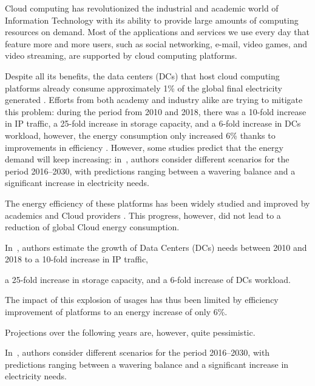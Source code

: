 
Cloud computing has revolutionized the industrial and academic world of Information Technology with its ability to provide large amounts of computing resources on demand. Most of the applications and services we use every day that feature more and more users, such as social networking, e-mail, video games, and video streaming, are supported by cloud computing platforms.

Despite all its benefits, the data centers (DCs) that host cloud computing platforms already consume approximately 1\% of the global final electricity generated \cite{IEA_2022}. Efforts from both academy and industry alike are trying to mitigate this problem: during the period from 2010 and 2018, there was a 10-fold increase in IP traffic, a 25-fold increase in storage capacity, and a 6-fold increase in DCs workload, however, the energy consumption only increased 6\% thanks to improvements in efficiency \cite{masanet2020recalibrating}. However, some studies predict that the energy demand will keep increasing: in~\cite{koot2021usage}, authors consider different scenarios for the period 2016--2030, with predictions ranging between a wavering balance and a significant increase in electricity needs.


The energy efficiency of these platforms has been widely studied and improved by academics and Cloud providers \cite{muralidhar2020energy}. This progress, however, did not lead to a reduction of global Cloud energy consumption.

In~\cite{masanet2020recalibrating}, authors estimate the growth of Data Centers (DCs) needs between 2010 and 2018 to a 10-fold increase in IP traffic,

a 25-fold increase in storage capacity, and a 6-fold increase of DCs workload.

The impact of this explosion of usages has thus been limited by efficiency improvement of platforms to an energy increase of only 6\%.

Projections over the following years are, however, quite pessimistic.


In~\cite{koot2021usage}, authors consider different scenarios for the period 2016--2030, with predictions ranging between a wavering balance and a significant increase in electricity needs.

